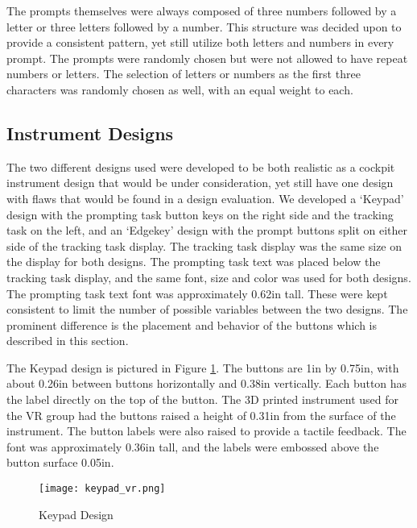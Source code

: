 The prompts themselves were always composed of three numbers followed by a letter or three letters followed by a number.
This structure was decided upon to provide a consistent pattern, yet still utilize both letters and numbers in every prompt.
The prompts were randomly chosen but were not allowed to have repeat numbers or letters. %
The selection of letters or numbers as the first three characters was randomly chosen as well, with an equal weight to each.

\subsection{Instrument Designs}

The two different designs used were developed to be both realistic as a cockpit instrument design that would be under consideration, yet still have one design with flaws that would be found in a design evaluation.
We developed a `Keypad' design with the prompting task button keys on the right side and the tracking task on the left, and an `Edgekey' design with the prompt buttons split on either side of the tracking task display.
The tracking task display was the same size on the display for both designs.
The prompting task text was placed below the tracking task display, and the same font, size and color was used for both designs.
The prompting task text font was approximately 0.62in tall.
These were kept consistent to limit the number of possible variables between the two designs.
The prominent difference is the placement and behavior of the buttons which is described in this section.

The Keypad design is pictured in Figure \ref{fig:de_keypad_design}.
The buttons are 1in by 0.75in, with about 0.26in between buttons horizontally and 0.38in vertically.
Each button has the label directly on the top of the button.
The 3D printed instrument used for the VR group had the buttons raised a height of 0.31in from the surface of the instrument.
The button labels were also raised to provide a tactile feedback.
The font was approximately 0.36in tall, and the labels were embossed above the button surface 0.05in.

\begin{figure}
    \centering
    \texttt{[image: keypad\_vr.png]}
    \caption{Keypad Design}
    \label{fig:de_keypad_design}
\end{figure}

